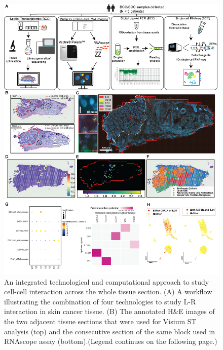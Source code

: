 \begin{figure}[htp]
    \centering
    \includegraphics[width=\columnwidth]{Chapter2/Figures/Chapter2_Fig1_techsum.png}
    \caption{An integrated technological and computational approach to study cell-cell interaction across the whole tissue section. (A) A workflow illustrating the combination of four technologies to study L-R interaction in skin cancer tissue. (B) The annotated H\&E images of the two adjacent tissue sections that were used for Visium ST analysis (top) and the consecutive section of the same block used in RNAscope assay (bottom).(Legend continues on the following page.)}
    \label{fig:Chap2_figure1}
\end{figure}
